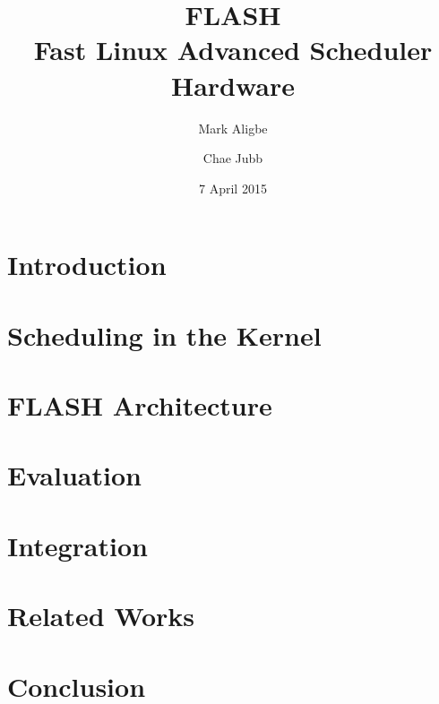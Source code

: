 \documentclass{sig-alternate-10pt}
\title{FLASH\\Fast Linux Advanced Scheduler Hardware}
\author{
	Mark Aligbe \\
	    \email{ma2799@columbia.edu}
	\and
    Chae Jubb \\
        \email{ecj2122@columbia.edu}
}
\date{7 April 2015}
\begin{document}
\maketitle

\begin{abstract}
\lipsum[1]
\end{abstract}


\section{Introduction}
\lipsum[1]

\section{Scheduling in the Kernel}
\lipsum[1]

\section{FLASH Architecture}
\lipsum[1]

\section{Evaluation}
\lipsum[1]

\section{Integration}
\lipsum[1]

\section{Related Works}
\lipsum[1]

\section{Conclusion}
\lipsum[1]
\end{document}
